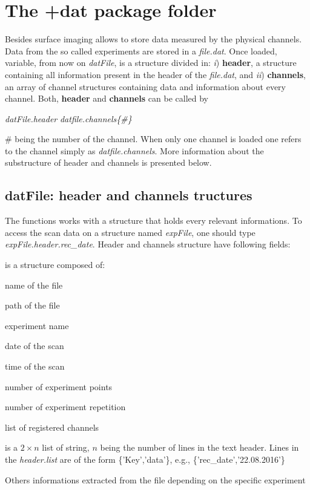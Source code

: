 \section{The +dat package folder}
\label{sec::dat}

Besides surface imaging \nanonis{} allows to store data measured by the physical channels. Data from the so called experiments are stored in a \emph{file.dat}.
Once loaded, variable, from now on \emph{datFile}, is a structure divided in: \emph{i}) \textbf{header}, a structure containing all information present in the header of the \emph{file.dat}, and \emph{ii}) \textbf{channels}, an array of channel structures containing data and information about every channel.
Both, \textbf{header} and \textbf{channels} can be called by
\begin{center}
\emph{datFile.header} \quad {} \quad \emph{datfile.channels\{\#\}}
\end{center}
\# being the number of the channel. When only one channel is loaded one refers to the channel simply as \emph{datfile.channels}. 
More information about the substructure of header and channels is presented below.


\subsection{datFile: header and channels tructures}
\label{sec:sxmFile}

The functions works with a structure that holds every relevant informations. To access the scan data on a structure named \emph{expFile}, one should type \emph{expFile.header.rec\_date}. Header and channels structure have following fields:

\bdf
\item[header] is a structure composed of:
  \bdf
  \item[file] name of the file
  \item[path] path of the file
  \item[experiment] experiment name
  \item[rec\_date] date of the scan
  \item[rec\_time] time of the scan
  \item[points] number of experiment points
  \item[grid\_points] number of experiment repetition
  \item[channels] list of registered channels
  \item[list] is a $2 \times n$ list of string, $n$ being the number of lines in the text header. Lines in the \emph{header.list} are of the form \{'Key','data'\}, e.g., \{'rec\_date','22.08.2016'\}
  \item[$\cdots$] Others informations extracted from the file depending on the specific experiment
  \edf

